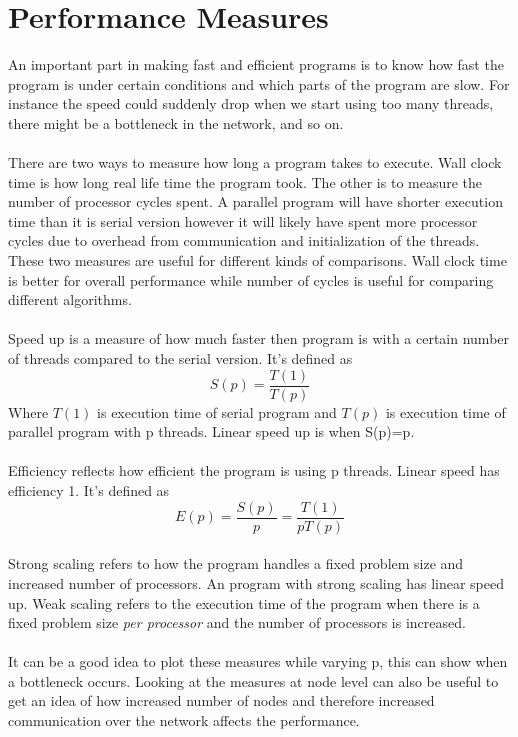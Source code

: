 \documentclass[10pt,a4paper]{report}
\begin{document}


\clearpage
\section{Performance Measures}
An important part in making fast and efficient programs is to know how fast the program is under certain conditions and which parts of the program are slow\cite{introduction_hpc_hager}. For instance the speed could suddenly drop when we start using too many threads, there might be a bottleneck in the network, and so on.\\
\\
There are two ways to measure how long a program takes to execute\cite{introduction_hpc_hager}. Wall clock time is how long real life time the program took. The other is to measure the number of processor cycles spent. A parallel program will have shorter execution time than it is serial version however it will likely have spent more processor cycles due to overhead from communication and initialization of the threads. These two measures are useful for different kinds of comparisons. Wall clock time is better for overall performance while number of cycles is useful for comparing different algorithms\cite{introduction_hpc_hager, cuda_best_practice}.\\
\\
Speed up is a measure of how much faster then program is with a certain number of threads compared to the serial version. It's defined as\cite{introduction_hpc_hager}
$$S(p)=\frac{T(1)}{T(p)}$$
Where $T(1)$ is execution time of serial program and $T(p)$ is execution time of parallel program with p threads. Linear speed up is when S(p)=p\cite{introduction_hpc_hager}.\\
\\
Efficiency reflects how efficient the program is using p threads. Linear speed has efficiency 1. It's defined as\cite{introduction_hpc_hager}
$$E(p)=\frac{S(p)}{p}=\frac{T(1)}{pT(p)}$$
\\
Strong scaling refers to how the program handles a fixed problem size and increased number of processors\cite{introduction_hpc_hager}. An program with strong scaling has linear speed up\cite{introduction_hpc_hager}. Weak scaling refers to the execution time of the program when there is a fixed problem size \emph{per processor} and the number of processors is increased\cite{introduction_hpc_hager, cuda_best_practice}.\\
\\
It can be a good idea to plot these measures while varying p, this can show when a bottleneck occurs. Looking at the measures at node level can also be useful to get an idea of how increased number of nodes and therefore increased communication over the network affects the performance.
\end{document}
